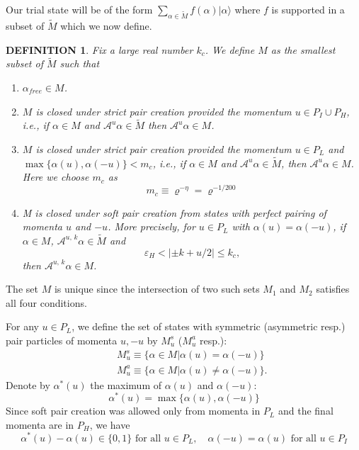 \documentclass[11pt]{article}
\numberwithin{equation}{section}
\newcommand{\e}{\varepsilon}
\newcommand{\beq}{\begin{equation}}
\newcommand{\eeq}{\end{equation}}
\newcommand{\beqa}{\begin{eqnarray}}
\newcommand{\eeqa}{\end{eqnarray}}
\newcommand\al{{\alpha}}
\newcommand\mcut{m_c}
\renewcommand\rho\varrho
\newtheorem{mydef}{DEFINITION}[section]
\theoremstyle{definition}
\begin{document}
Our trial state will be of the form  $\sum_{\al\in \widetilde  M}f(\al)|\al\rangle$ where $f$ is  supported in a 
subset of $\widetilde M$ which we now define. 


\begin{mydef}\label{M}
Fix a large real number $k_c$. 
We define $M$ as the smallest subset of $\widetilde M$ such that
\begin{enumerate}
	\item $\al_{free} \in M$.
	\item  $M$ is closed under strict pair creation provided the momentum  $u\in P_I\cup P_H$, i.e.,  if  $\al \in M$ and $\mathcal A^{u}\al\in \widetilde M$ then $\mathcal A^{u}\al\in M$.
	\item $M$ is closed under strict pair creation provided the momentum  $u\in P_L$  and  $\max\{\al(u), \al(-u)\}<\mcut$, i.e., 
	if  $\al \in M$ and $\mathcal A^{u}\al\in \widetilde M$, then $\mathcal A^{u}\al\in M$. Here we choose $m_c$ as 
	\beq\label{defmc}
	m_c\equiv\rho^{-\eta}=\rho^{-1/200}
	\eeq
	\item   M is closed under soft pair creation from states with perfect pairing of momenta $u$ and $-u$. More precisely, 
	for $u \in P_L$ with $\al(u)=\al(-u)$, if $\al \in M$, $\mathcal A^{u,\,k}\al\in \widetilde M$ and 
	$$ \e_H < |\pm k+u/2|\leq k_c,%
	$$ 
	then $\mathcal A^{u,\,k}\al\in M$. 
\end{enumerate}
\end{mydef}
The set $M$ is unique since the intersection of two such sets $M_1$ and $M_2$ satisfies all four conditions. 

For any $u\in P_L$, we define the set of states with symmetric (asymmetric resp.)  pair particles of momenta $u, -u$ 
by  $M_u^s$ ($M_u^a$ resp.): 
\beqa\label{defMsau}
&&M_u^s\equiv\{\al\in M|\al(u)=\al(-u)\}\\\nonumber
&&M_u^a\equiv\{\al\in M|\al(u)\neq\al(-u)\}.
\eeqa
Denote by  $\al^*(u)$  the maximum of $\al(u)$ and $ \al(-u)$:
\beq\label{def*}
\al^*(u)=\max\{\al(u), \al(-u)\}
\eeq 
Since soft pair creation was allowed only from momenta in $P_L$ and the final momenta are in $P_H$, we have 
\[
\al^*(u)- \al(u)\in \{0, 1 \} \text{ for all }  u \in P_L, \quad  \al(-u)= \al(u) \text{ for all }  u \in P_I
\]
\end{document}
